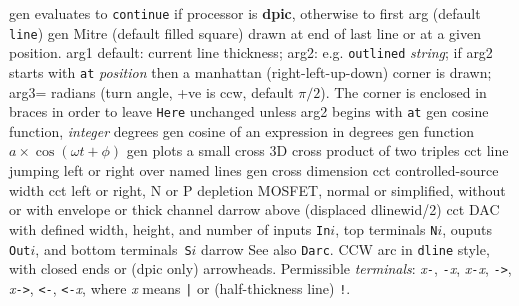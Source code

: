   {gen}
  {evaluates to {\tt continue}
    if processor is {\bf dpic}, otherwise to first arg (default {\tt line})}
  {gen}
  { Mitre (default filled square) drawn at end of last line or at a
    given position.
    arg1 default: current line thickness;
    arg2: e.g. {\tt outlined} {\sl string}; if arg2 starts with
    {\tt at} {\sl position} then a manhattan (right-left-up-down) corner
    is drawn;
    arg3= radians (turn angle, +ve is ccw, default $\pi/2$).
    The corner is enclosed in braces
    in order to leave {\tt Here} unchanged unless arg2 begins with {\tt at}
    }
  {gen}
  {cosine function, {\sl integer\/} degrees}
  {gen}
  {cosine of an expression in degrees}
  {gen}
  {function $a\times\cos(\omega t + \phi)$ }
  {gen}
  {plots a small cross}
  {3D}
  {cross product of two triples}
  {cct}
  {line jumping left or right over named lines}
  {gen}
  {cross dimension}
  {cct}
  {controlled-source width}
%
  {cct}
  {left or right, N or P depletion MOSFET, normal or simplified,
    without or with envelope or thick channel
    }
  {darrow}
  {above (displaced dlinewid/2)}
  {cct}
  {DAC with defined width, height, and number of inputs {\tt In$i$},
    top terminals {\tt N$i$}, ouputs {\tt Out$i$},
    and bottom terminals~{\tt S$i$} }
  {darrow}
  {See also {\tt Darc}.
   CCW arc in {\tt dline} style, with closed ends or (dpic only) arrowheads.
  Permissible {\sl terminals}:
  {\sl x}{\tt -},
  {\tt -}{\sl x}, {\sl x}{\tt -}{\sl x}, {\tt ->}, {\sl x}{\tt ->},
  {\tt <-}, {\tt <-}{\sl x}, {\tt <->}
  where {\sl x} means {\tt |} or (half-thickness line) {\tt !}.}

